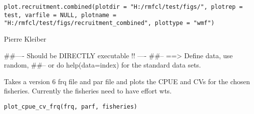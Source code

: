 \documentclass[a4paper]{book}
\begin{document}
%
\begin{Usage}
\begin{verbatim}
plot.recruitment.combined(plotdir = "H:/rmfcl/test/figs/", plotrep = test, varfile = NULL, plotname = "H:/rmfcl/test/figs/recruitment_combined", plottype = "wmf")
\end{verbatim}
\end{Usage}
%
\begin{Arguments}
\begin{ldescription}
\item[\code{plotdir}] 


\item[\code{plotrep}] 


\item[\code{varfile}] 


\item[\code{plotname}] 


\item[\code{plottype}] 


\end{ldescription}
\end{Arguments}
%
\begin{Author}\relax

Pierre Kleiber
\end{Author}
%
\begin{Examples}
\begin{ExampleCode}
##---- Should be DIRECTLY executable !! ----
##-- ==>  Define data, use random,
##--	or do  help(data=index)  for the standard data sets.

\end{ExampleCode}
\end{Examples}
%
\begin{Description}\relax

Takes a version 6 frq file and par file and plots the CPUE and CVs for the chosen fisheries. Currently the fisheries need to have effort wts.
\end{Description}
%
\begin{Usage}
\begin{verbatim}
plot_cpue_cv_frq(frq, parf, fisheries)
\end{verbatim}
\end{Usage}
%
\begin{Arguments}
\begin{ldescription}
\item[\code{frq}] 


\item[\code{parf}] 


\item[\code{fisheries}] 


\end{ldescription}
\end{Arguments}
\end{document}
